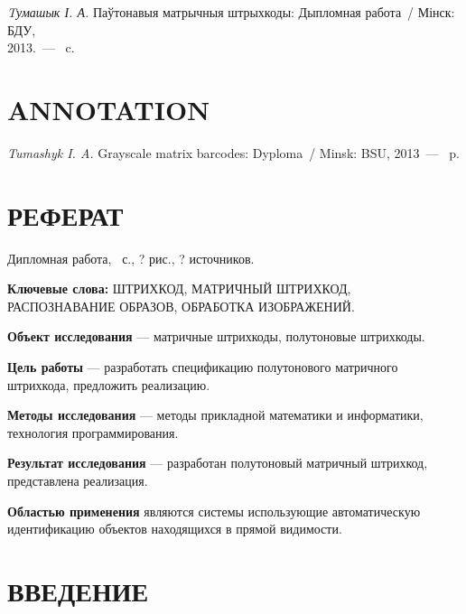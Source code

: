 \textit{Tумашык І. А.} Паўтонавыя матрычныя штрыхкоды:
Дыпломная работа~/ Мінск: БДУ, \\ 2013.~--- \pagescount~c.

\medskip


\section*{ANNOTATION}

\textit{Tumashyk I. A.} Grayscale matrix barcodes:
Dyploma~/ Minsk: BSU, 2013~--- \pagescount~p.

\medskip

\newpage

\section*{РЕФЕРАТ}

Дипломная работа, \pagescount\ с., ? рис., 
? источников. 

\medskip
\textbf{Ключевые слова:} ШТРИХКОД, МАТРИЧНЫЙ ШТРИХКОД, 
РАСПОЗНАВАНИЕ ОБРАЗОВ, ОБРАБОТКА ИЗОБРАЖЕНИЙ.

\medskip
\textbf{Объект исследования} --- матричные штрихкоды, полутоновые штрихкоды.

\textbf{Цель работы} --- разработать спецификацию полутонового матричного 
штрихкода, предложить реализацию.

\textbf{Методы исследования} --- методы прикладной математики и информатики, 
технология программирования.

\textbf{Результат исследования} --- разработан полутоновый матричный 
штрихкод, представлена реализация. 

\textbf{Областью применения} являются системы использующие автоматическую
идентификацию объектов находящихся в прямой видимости.

\newpage

\renewcommand{\contentsname}{СОДЕРЖАНИЕ}
\tableofcontents

\newpage
\listoffigures
\listoftables
\newpage



\section*{ВВЕДЕНИЕ}

